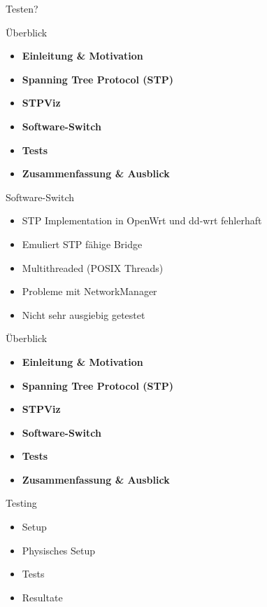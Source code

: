 \documentclass{beamer}
\begin{document}
\begin{frame}{}
    \centering
    \huge \alert{Testen?}
\end{frame}

\begin{frame}{Überblick}
    \begin{itemize}
        \item \textbf{Einleitung \& Motivation}
        \item \textbf{Spanning Tree Protocol (STP)}
        \item \textbf{STPViz}
        \item \alert{\textbf{Software-Switch}}
        \item \textbf{Tests}
        \item \textbf{Zusammenfassung \& Ausblick}
    \end{itemize}
\end{frame}

\begin{frame}{Software-Switch}
    \begin{itemize}[<+->]
        \item STP Implementation in OpenWrt und dd-wrt fehlerhaft
        \item Emuliert STP fähige Bridge
        \item Multithreaded (POSIX Threads)
        \item \alert<7>{Probleme mit NetworkManager}
        \item Nicht sehr ausgiebig getestet
    \end{itemize}
\end{frame}

\begin{frame}{Überblick}
    \begin{itemize}
        \item \textbf{Einleitung \& Motivation}
        \item \textbf{Spanning Tree Protocol (STP)}
        \item \textbf{STPViz}
        \item \textbf{Software-Switch}
        \item \alert{\textbf{Tests}}
        \item \textbf{Zusammenfassung \& Ausblick}
    \end{itemize}
\end{frame}

\begin{frame}{Testing}
    \begin{itemize}
        \item Setup
        \item Physisches Setup
        \item Tests
        \item Resultate
    \end{itemize}
\end{frame}
\end{document}
